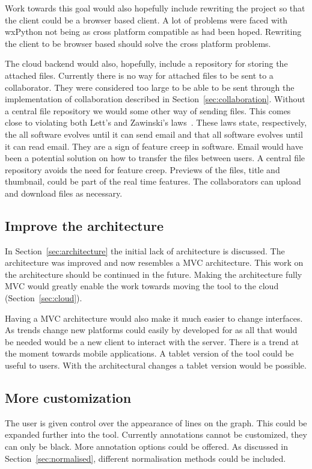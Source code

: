 Work towards this goal would also hopefully include rewriting the project so that the client could be a browser based client.  A lot of problems were faced with wxPython not being as cross platform compatible as had been hoped.  Rewriting the client to be browser based should solve the cross platform problems.

The cloud backend would also, hopefully, include a repository for storing the attached files.  Currently there is no way for attached files to be sent to a collaborator.  They were considered too large to be able to be sent through the implementation of collaboration described in Section~\ref{sec:collaboration}.  Without a central file repository we would some other way of sending files.  This comes close to violating both Lett's and Zawinski's laws~\cite{atwoord}.  These laws state, respectively, the all software evolves until it can send email and that all software evolves until it can read email.  They are a sign of feature creep in software.  Email would have been a potential solution on how to transfer the files between users.  A central file repository avoids the need for feature creep.  Previews of the files, title and thumbnail, could be part of the real time features.  The collaborators can upload and download files as necessary.

\subsection{Improve the architecture}

In Section~\ref{sec:architecture} the initial lack of architecture is discussed.  The architecture was improved and now resembles a \ac{MVC} architecture.  This work on the architecture should be continued in the future.  Making the architecture fully \ac{MVC} would greatly enable the work towards moving the tool to the cloud (Section~\ref{sec:cloud}).

Having a \ac{MVC} architecture would also make it much easier to change interfaces.  As trends change new platforms could easily by developed for as all that would be needed would be a new client to interact with the server.  There is a trend at the moment towards mobile applications.  A tablet version of the tool could be useful to users.  With the architectural changes a tablet version would be possible.

\subsection{More customization}
The user is given control over the appearance of lines on the graph.  This could be expanded further into the tool.  Currently annotations cannot be customized, they can only be black.  More annotation options could be offered.  As discussed in Section~\ref{sec:normalised}, different normalisation methods could be included.

